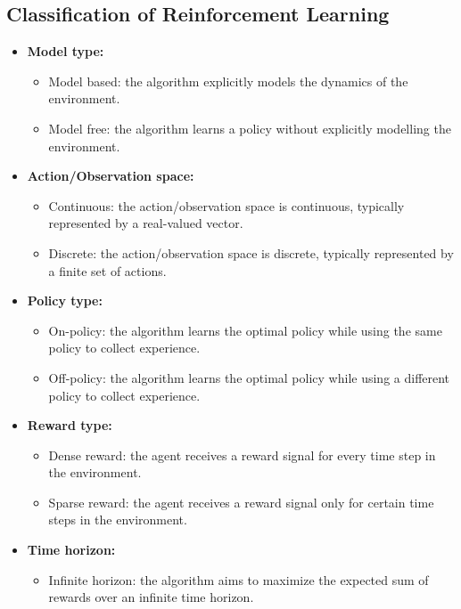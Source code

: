 \subsection{Classification of Reinforcement Learning}
\begin{minipage}{\textwidth}
\begin{itemize}

    \item \textbf{Model type:}
    \begin{itemize}
    \item Model based: the algorithm explicitly models the dynamics of the environment.
    \item Model free: the algorithm learns a policy without explicitly modelling the environment.
    \end{itemize}
    \item \textbf{Action/Observation space:}
    \begin{itemize}
    \item Continuous: the action/observation space is continuous, typically represented by a real-valued vector.
    \item Discrete: the action/observation space is discrete, typically represented by a finite set of actions.
    \end{itemize}
    \item \textbf{Policy type:}
    \begin{itemize}
    \item On-policy: the algorithm learns the optimal policy while using the same policy to collect experience.
    \item Off-policy: the algorithm learns the optimal policy while using a different policy to collect experience.
    \end{itemize}
    \item \textbf{Reward type:}
    \begin{itemize}
    \item Dense reward: the agent receives a reward signal for every time step in the environment.
    \item Sparse reward: the agent receives a reward signal only for certain time steps in the environment.
    \end{itemize}
    \item \textbf{Time horizon:}
    \begin{itemize}
    \item Infinite horizon: the algorithm aims to maximize the expected sum of rewards over an infinite time horizon.

\end{itemize}
\end{itemize}
\end{minipage}
